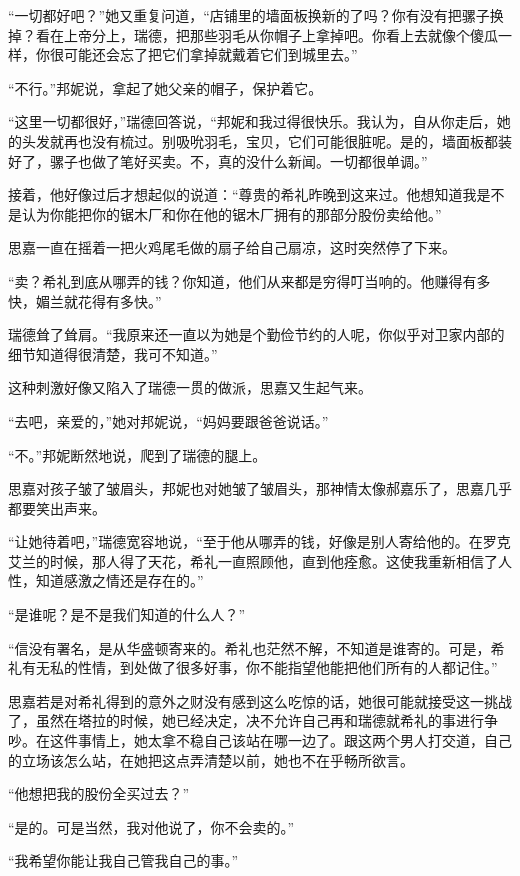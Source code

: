 \par “一切都好吧？”她又重复问道，“店铺里的墙面板换新的了吗？你有没有把骡子换掉？看在上帝分上，瑞德，把那些羽毛从你帽子上拿掉吧。你看上去就像个傻瓜一样，你很可能还会忘了把它们拿掉就戴着它们到城里去。”
\par “不行。”邦妮说，拿起了她父亲的帽子，保护着它。
\par “这里一切都很好，”瑞德回答说，“邦妮和我过得很快乐。我认为，自从你走后，她的头发就再也没有梳过。别吸吮羽毛，宝贝，它们可能很脏呢。是的，墙面板都装好了，骡子也做了笔好买卖。不，真的没什么新闻。一切都很单调。”
\par 接着，他好像过后才想起似的说道：“尊贵的希礼昨晚到这来过。他想知道我是不是认为你能把你的锯木厂和你在他的锯木厂拥有的那部分股份卖给他。”
\par 思嘉一直在摇着一把火鸡尾毛做的扇子给自己扇凉，这时突然停了下来。
\par “卖？希礼到底从哪弄的钱？你知道，他们从来都是穷得叮当响的。他赚得有多快，媚兰就花得有多快。”
\par 瑞德耸了耸肩。“我原来还一直以为她是个勤俭节约的人呢，你似乎对卫家内部的细节知道得很清楚，我可不知道。”
\par 这种刺激好像又陷入了瑞德一贯的做派，思嘉又生起气来。
\par “去吧，亲爱的，”她对邦妮说，“妈妈要跟爸爸说话。”
\par “不。”邦妮断然地说，爬到了瑞德的腿上。
\par 思嘉对孩子皱了皱眉头，邦妮也对她皱了皱眉头，那神情太像郝嘉乐了，思嘉几乎都要笑出声来。
\par “让她待着吧，”瑞德宽容地说，“至于他从哪弄的钱，好像是别人寄给他的。在罗克艾兰的时候，那人得了天花，希礼一直照顾他，直到他痊愈。这使我重新相信了人性，知道感激之情还是存在的。”
\par “是谁呢？是不是我们知道的什么人？”
\par “信没有署名，是从华盛顿寄来的。希礼也茫然不解，不知道是谁寄的。可是，希礼有无私的性情，到处做了很多好事，你不能指望他能把他们所有的人都记住。”
\par 思嘉若是对希礼得到的意外之财没有感到这么吃惊的话，她很可能就接受这一挑战了，虽然在塔拉的时候，她已经决定，决不允许自己再和瑞德就希礼的事进行争吵。在这件事情上，她太拿不稳自己该站在哪一边了。跟这两个男人打交道，自己的立场该怎么站，在她把这点弄清楚以前，她也不在乎畅所欲言。
\par “他想把我的股份全买过去？”
\par “是的。可是当然，我对他说了，你不会卖的。”
\par “我希望你能让我自己管我自己的事。”
